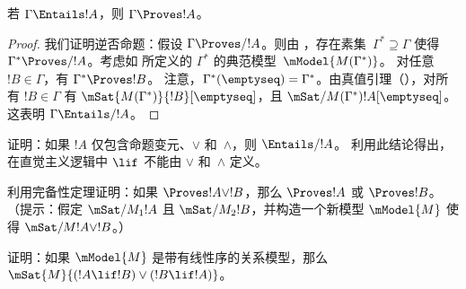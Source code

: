 \documentclass[../../../include/open-logic-section]{subfiles}
\begin{document}


\begin{thm}
  若 $\Gamma \Entails !A$，则 $\Gamma \Proves !A$。
\end{thm}

\begin{proof}
  我们证明逆否命题：假设 $\Gamma \Proves/ !A$。则由
  ，存在素集~$\Gamma^*
  \supseteq \Gamma$ 使得 $\Gamma^* \Proves/ !A$。考虑如
   所定义的 $\Gamma^*$ 的典范模型~$\mModel{M(\Gamma^*)}$。
  对任意 $!B \in \Gamma$，有 $\Gamma^* \Proves !B$。
  注意，$\Gamma^*(\emptyseq) = \Gamma^*$。由真值引理（），对所有 $!B \in \Gamma$ 有
  $\mSat{M(\Gamma^*)}{!B}[\emptyseq]$，且
  $\mSat/{M(\Gamma^*)}{!A}[\emptyseq]$。这表明 $\Gamma
  \Entails/ !A$。
\end{proof}

\begin{prob}
  证明：如果 $!A$ 仅包含命题变元、$\lor$ 和~$\land$，则 $\Entails/ !A$。
  利用此结论得出，在直觉主义逻辑中 $\lif$ 不能由 $\lor$ 和~$\land$ 定义。
\end{prob}

\begin{prob}
  利用完备性定理证明：如果 $\Proves !A \lor !B$，那么
  $\Proves !A$ 或 $\Proves !B$。（提示：假定 $\mSat/{M_1}{!A}$ 且
  $\mSat/{M_2}{!B}$，并构造一个新模型 $\mModel{M}$ 使得
  $\mSat/{M}{!A \lor !B}$。）
\end{prob}

\begin{prob}
  证明：如果 $\mModel{M}$ 是带有线性序的关系模型，那么
  $\mSat{M}{(!A \lif !B)\lor(!B \lif !A)}$。
\end{prob}
\end{document}
